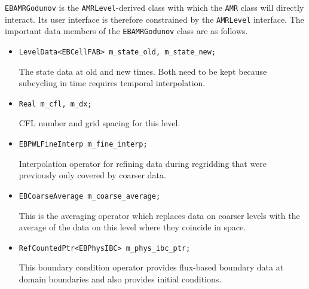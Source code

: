 {\tt EBAMRGodunov} is the {\tt AMRLevel}-derived class with 
which the {\tt AMR} class will directly interact.  Its user
interface is therefore constrained by the {\tt AMRLevel} 
interface.   The important data members of the {\tt EBAMRGodunov}
class are as follows.
\begin{itemize}
\item \begin{small} \begin{verbatim}
LevelData<EBCellFAB> m_state_old, m_state_new;
\end{verbatim}\end{small}
The state data at old  and new times.  Both need to be kept
because subcycling in time requires temporal interpolation.

\item \begin{small} \begin{verbatim}
Real m_cfl, m_dx;
\end{verbatim}\end{small}
CFL number and grid spacing for this level.

\item \begin{small} \begin{verbatim}
EBPWLFineInterp m_fine_interp;
\end{verbatim}\end{small}
Interpolation operator for refining data during regridding that
were previously only covered by coarser data.

\item \begin{small} \begin{verbatim}
EBCoarseAverage m_coarse_average;
\end{verbatim}\end{small}
This is the averaging operator which replaces data on coarser levels with
the average of the data on this level where they coincide in space.

\item \begin{small} \begin{verbatim}
RefCountedPtr<EBPhysIBC> m_phys_ibc_ptr;
\end{verbatim}\end{small}
This boundary condition operator provides flux-based boundary
data at domain boundaries and also provides initial conditions.
\end{itemize}

